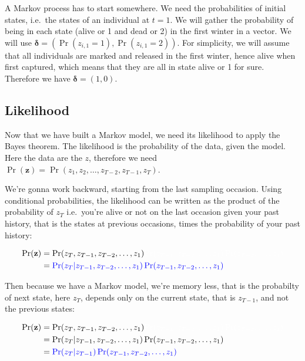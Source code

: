 \documentclass[
  12pt,
]{krantz}
\begin{document}
A Markov process has to start somewhere. We need the probabilities of initial states, i.e.~the states of an individual at \(t = 1\). We will gather the probability of being in each state (alive or 1 and dead or 2) in the first winter in a vector. We will use \(\mathbf{\delta} = \left(\Pr(z_{i,1} = 1), \Pr(z_{i,1} = 2)\right)\). For simplicity, we will assume that all individuals are marked and released in the first winter, hence alive when first captured, which means that they are all in state alive or 1 for sure. Therefore we have \(\mathbf{\delta} = \left(1, 0\right)\).

\hypertarget{likelihood}{%
\subsection{Likelihood}\label{likelihood}}

Now that we have built a Markov model, we need its likelihood to apply the Bayes theorem. The likelihood is the probability of the data, given the model. Here the data are the \(z\), therefore we need \(\Pr(\mathbf{z}) = \Pr(z_1, z_2, \ldots, z_{T-2}, z_{T-1}, z_T)\).

We're gonna work backward, starting from the last sampling occasion. Using conditional probabilities, the likelihood can be written as the product of the probability of \(z_T\) i.e.~you're alive or not on the last occasion given your past history, that is the states at previous occasions, times the probability of your past history:

\begin{align*}
\Pr(\mathbf{z}) &= \Pr(z_T, z_{T-1}, z_{T-2}, \ldots, z_1) \color{white}{\Pr(z_{T-1}, z_{T-2},\ldots, z_1) \Pr(z_{T-2}, \ldots, z_1)}\\
                &= \color{blue}{\Pr(z_T | z_{T-1}, z_{T-2},\ldots, z_1) \Pr(z_{T-1}, z_{T-2},\ldots, z_1)} \\
\end{align*}

Then because we have a Markov model, we're memory less, that is the probabilty of next state, here \(z_T\), depends only on the current state, that is \(z_{T-1}\), and not the previous states:

\begin{align*}
\Pr(\mathbf{z}) &= \Pr(z_T, z_{T-1}, z_{T-2}, \ldots, z_1) \color{white}{\Pr(z_{T-1}, z_{T-2},\ldots, z_1) \Pr(z_{T-2}, \ldots, z_1)}\\
                &= \Pr(z_T | z_{T-1}, z_{T-2},\ldots, z_1) \Pr(z_{T-1}, z_{T-2},\ldots, z_1) \\
                &= \color{blue}{\Pr(z_T | z_{T-1})} \Pr(z_{T-1}, z_{T-2},\ldots, z_1) \\
\end{align*}
\end{document}
